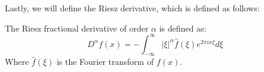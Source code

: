 Lastly, we will define the Riesz derivative, which is defined as follows:
\begin{definition}
    The Riesz fractional derivative of order \(\alpha\) is defined as:
    \begin{equation}
        D^{\alpha} f(x) = -\int_{-\infty}^{\infty} |\xi|^{\alpha} \hat{f}(\xi) e^{2\pi i  x \xi} d\xi
    \end{equation}
    Where \(\hat{f}(\xi)\) is the Fourier transform of \(f(x)\).
\end{definition}